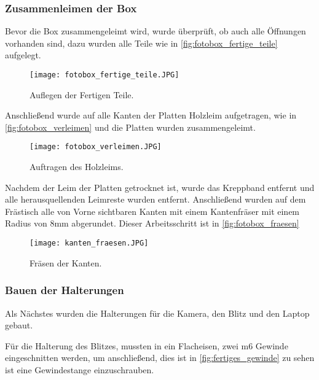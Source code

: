 \newpage

\subsubsection{Zusammenleimen der Box}

Bevor die Box zusammengeleimt wird, wurde überprüft, ob auch alle Öffnungen 
vorhanden sind, dazu wurden alle Teile wie in \autoref{fig:fotobox_fertige_teile}
aufgelegt. 

\begin{figure}[H]
    \centering
    \texttt{[image: fotobox\_fertige\_teile.JPG]}
    \caption{Auflegen der Fertigen Teile.}
    \label{fig:fotobox_fertige_teile}
\end{figure}

Anschließend wurde auf alle Kanten der Platten Holzleim aufgetragen, wie in 
\autoref{fig:fotobox_verleimen} und die Platten wurden zusammengeleimt.

\begin{figure}[H]
    \centering
    \texttt{[image: fotobox\_verleimen.JPG]}
    \caption{Auftragen des Holzleims.}
    \label{fig:fotobox_verleimen}
\end{figure}

\newpage

Nachdem der Leim der Platten getrocknet ist, wurde das Kreppband entfernt und
alle herausquellenden Leimreste wurden entfernt. Anschließend wurden auf 
dem Frästisch alle von Vorne sichtbaren Kanten mit einem Kantenfräser mit einem
Radius von 8mm abgerundet. Dieser Arbeitsschritt ist in \autoref{fig:fotobox_fraesen}

\begin{figure}[H]
    \centering
    \texttt{[image: kanten\_fraesen.JPG]}
    \caption{Fräsen der Kanten.}
    \label{fig:fotobox_fraesen}
\end{figure}

\newpage

\subsubsection{Bauen der Halterungen}

Als Nächstes wurden die Halterungen für die Kamera, den Blitz und den Laptop gebaut.


Für die Halterung des Blitzes, mussten in ein Flacheisen, zwei m6 Gewinde
eingeschnitten werden, um anschließend, dies ist in \autoref{fig:fertiges_gewinde}
zu sehen ist eine Gewindestange einzuschrauben.

